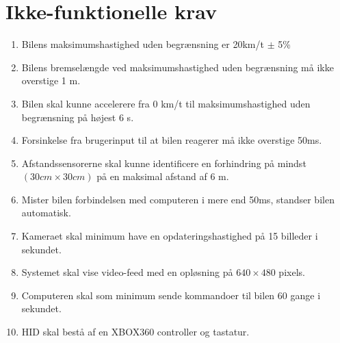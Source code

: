 \section{Ikke-funktionelle krav} \label{sec:ikke-funktionelle_krav}
\begin{enumerate}\itemsep1pt \parskip0pt 
	\item Bilens maksimumshastighed uden begrænsning er 20km/t $\pm$ 5\% %
	\item Bilens bremselængde ved maksimumshastighed uden begrænsning må ikke overstige 1 m. %
	\item Bilen skal kunne accelerere fra 0 km/t til maksimumshastighed uden begrænsning på højest 6 s. %
	\item Forsinkelse fra brugerinput til at bilen reagerer må ikke overstige 50ms. %
	\item Afstandssensorerne skal kunne identificere en forhindring på mindst $(30cm \times 30cm)$ på en maksimal afstand af 6 m. %
	\item Mister bilen forbindelsen med computeren i mere end 50ms, standser bilen automatisk. 
	\item Kameraet skal minimum have en opdateringshastighed på 15 billeder i sekundet. %
	\item Systemet skal vise video-feed med en opløsning på $640 \times 480$ pixels.
	\item Computeren skal som minimum sende kommandoer til bilen 60 gange i sekundet. 
	\item HID skal bestå af en XBOX360 controller og tastatur.
\end{enumerate}
\clearpage
